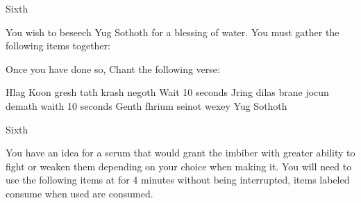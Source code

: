 \documentclass[greennotebook]{guildcamp4} %
\begin{document}
\begin{page}{Sixth}
	
		You wish to beseech Yug Sothoth for a blessing of water. You must gather the following items together: 
		
		Once you have done so, Chant the following verse:
		
		Hlag Koon gresh tath krash negoth
		Wait 10 seconds
		Jring dilas brane jocun demath
		waith 10 seconds
		Genth fhrium seinot wexey Yug Sothoth
	
\end{page}

\begin{page}{Sixth}
	
	You have an idea for a serum that would grant the imbiber with greater ability to fight or weaken them depending on your choice when making it.
	You will need to use the following items at for 4 minutes without being interrupted, items labeled consume when used are consumed.
	
\end{page}


\endnotebook
\end{document}
